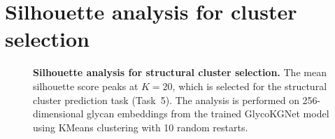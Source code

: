 \documentclass[11pt,a4paper]{article}
\begin{document}
\section{Silhouette analysis for cluster selection}
\label{sec:silhouette}

\begin{figure}[H]
\centering
{}
\caption{\textbf{Silhouette analysis for structural cluster selection.}
The mean silhouette score peaks at $K = 20$, which is selected for the
structural cluster prediction task (Task~5). The analysis is performed on
256-dimensional glycan embeddings from the trained GlycoKGNet model using
KMeans clustering with 10 random restarts.}
\label{fig:silhouette}
\end{figure}
\end{document}
